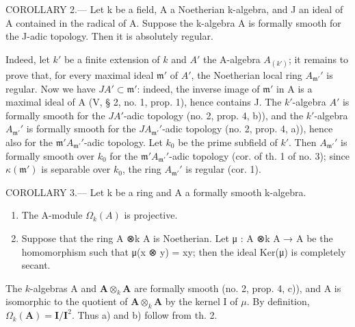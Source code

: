 COROLLARY 2.--- Let k be a field, A a Noetherian k-algebra, and J an ideal of A contained in the radical of A. Suppose the k-algebra A is formally smooth for the J-adic topology. Then it is absolutely regular.

Indeed, let \(k'\) be a finite extension of \(k\) and \(A'\) the A-algebra \(A_{(k')}\); it remains to prove that, for every maximal ideal \(\mathfrak{m}'\) of \(A'\), the Noetherian local ring \(A_{\mathfrak{m}'}'\) is regular. Now we have \(JA' \subset \mathfrak{m}'\): indeed, the inverse image of \(\mathfrak{m}'\) in A is a maximal ideal of A (V, § 2, no. 1, prop. 1), hence contains J. The \(k'\)-algebra \(A'\) is formally smooth for the \(JA'\)-adic topology (no. 2, prop. 4, b)), and the \(k'\)-algebra \(A_{\mathfrak{m}'}'\) is formally smooth for the \(JA_{\mathfrak{m}'}'\)-adic topology (no. 2, prop. 4, a)), hence also for the \(\mathfrak{m}'A_{\mathfrak{m}'}'\)-adic topology. Let \(k_0\) be the prime subfield of \(k'\). Then \(A_{\mathfrak{m}'}'\) is formally smooth over \(k_0\) for the \(\mathfrak{m}'A_{\mathfrak{m}'}'\)-adic topology (cor. of th. 1 of no. 3); since \(\kappa(\mathfrak{m}')\) is separable over \(k_0\), the ring \(A_{\mathfrak{m}'}'\) is regular (cor. 1).

COROLLARY 3.--- Let k be a ring and A a formally smooth k-algebra.

\begin{enumerate}
\def\labelenumi{\alph{enumi})}
\item
  The A-module \(\Omega_k(A)\) is projective.
\item
  Suppose that the ring A ⊗k A is Noetherian. Let μ : A ⊗k A → A be the homomorphism such that μ(x ⊗ y) = xy; then the ideal Ker(μ) is completely secant.
\end{enumerate}

The \(k\)-algebras A and \(\mathbf{A} \otimes_{k} \mathbf{A}\) are formally smooth (no. 2, prop. 4, c)), and A is isomorphic to the quotient of \(\mathbf{A} \otimes_{k} \mathbf{A}\) by the kernel I of \(\mu\). By definition, \(\Omega_{k}(\mathbf{A}) = \mathbf{I}/\mathbf{I}^{2}\). Thus a) and b) follow from th. 2.

